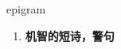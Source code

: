 
\begin{frame}
{\huge epigram}
\begin{center}
\begin{enumerate}\Large
  \item \textbf{机智的短诗，警句}
\end{enumerate}
\end{center}
\end{frame}
